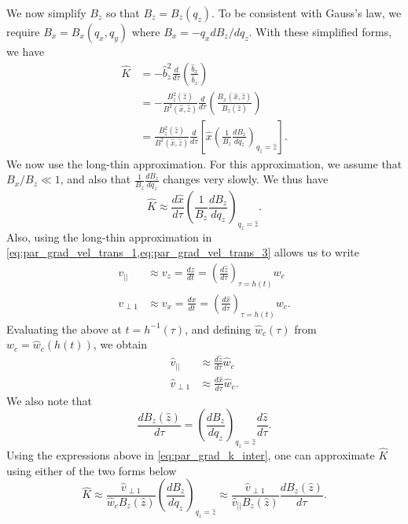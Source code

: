 \documentclass[a4paper,11pt]{report}
\begin{document}
We now simplify $B_z$ so that $B_z = B_z(q_z)$. To be consistent with Gauss's law, we require $B_x = B_x(q_x,q_y)$ where $B_x = -q_x dB_z/dq_z$. With these simplified forms, we have
\begin{align}
    \hat{K} &= -\hat{b}_z^2 \frac{d}{d\tau} \left ( \frac{\hat{b}_x}{\hat{b}_z} \right ) \\
    &= -\frac{B_z^2(\hat{z})}{B^2(\hat{x},\hat{z})} \frac{d}{d\tau} \left ( \frac{B_x(\hat{x},\hat{z})}{B_z(\hat{z})} \right ) \\
    &= \frac{B_z^2(\hat{z})}{B^2(\hat{x},\hat{z})} \frac{d}{d\tau} \left [ \hat{x}  \left ( \frac{1}{B_z} \frac{dB_z}{dq_z} \right )_{q_z = \hat{z}} \right ].
\end{align}
We now use the long-thin approximation. For this approximation, we assume that $B_x / B_z \ll 1$, and also that $\frac{1}{B_z} \frac{dB_z}{dq_z}$ changes very slowly. We thus have
\begin{equation}
\label{eq:par_grad_k_inter}
    \hat{K} \approx \frac{d \hat{x}}{d\tau} \left ( \frac{1}{B_z} \frac{dB_z}{dq_z} \right)_{q_z = \hat{z}}.
\end{equation}
Also, using the long-thin approximation in \cref{eq:par_grad_vel_trans_1,eq:par_grad_vel_trans_3} allows us to write
\begin{align}
    v_{||} &\approx v_z = \frac{dz}{dt} = \left ( \frac{d\hat{z}}{d\tau} \right )_{\tau = h(t)} w_c \\
    v_{\perp1} & \approx v_x = \frac{dx}{dt} = \left ( \frac{d \hat{x}}{d\tau} \right )_{\tau = h(t)} w_c.
\end{align}
Evaluating the above at $t = h^{-1}(\tau)$, and defining $\hat{w}_c(\tau)$ from $w_c = \hat{w}_c(h(t))$, we obtain
\begin{align}
    \hat{v}_{||} &\approx  \frac{d\hat{z}}{d\tau}  \hat{w}_c \\
    \hat{v}_{\perp1} & \approx \frac{d \hat{x}}{d\tau} \hat{w}_c.
\end{align}
We also note that
\begin{equation}
    \frac{d B_z(\hat{z})}{d\tau} = \left ( \frac{dB_z}{dq_z} \right )_{q_z = \hat{z}} \frac{d \hat{z}}{d\tau}.
\end{equation}
Using the expressions above in \cref{eq:par_grad_k_inter}, one can approximate $\hat{K}$ using either of the two forms below
\begin{equation}
    \hat{K} \approx \frac{\hat{v}_{\perp1}}{\hat{w}_c B_z(\hat{z})} \left ( \frac{dB_z}{dq_z} \right )_{q_z = \hat{z}} \approx \frac{\hat{v}_{\perp1}}{\hat{v}_{||} B_z(\hat{z})} \frac{dB_z(\hat{z})}{d\tau} .
\end{equation}
\end{document}
